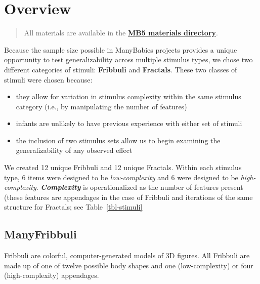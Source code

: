 \documentclass[
  letterpaper,
  DIV=11,
  numbers=noendperiod,
  oneside]{scrreprt}
\providecommand{\tightlist}{%
  \setlength{\itemsep}{0pt}\setlength{\parskip}{0pt}}
\begin{document}
\section{Overview}\label{overview-1}

\begin{quote}
All materials are available in the
\href{https://drive.google.com/drive/folders/1ces1jzHYVV0Wx29JAtdfGAZx_pDAAh5l?usp=sharing}{\textbf{MB5
materials directory}}.
\end{quote}

Because the sample size possible in ManyBabies projects provides a
unique opportunity to test generalizability across multiple stimulus
types, we chose two different categories of stimuli:
\textbf{Fribbuli} and \textbf{Fractals}. These two classes of stimuli were
chosen because:

\begin{itemize}
\tightlist
\item
  they allow for variation in stimulus complexity within the same
  stimulus category (i.e., by manipulating the number of features)
\item
  infants are unlikely to have previous experience with either set of
  stimuli
\item
  the inclusion of two stimulus sets allow us to begin examining the
  generalizability of any observed effect
\end{itemize}

We created 12 unique Fribbuli and 12 unique Fractals. Within each
stimulus type, 6 items were designed to be \emph{low-complexity} and 6
were designed to be \emph{high-complexity}. \textbf{\emph{Complexity}}
is operationalized as the number of features present (these features are
appendages in the case of Fribbuli and iterations of the same structure
for Fractals; see Table~\ref{tbl-stimuli}

\subsection[ManyFribbuli]{\texorpdfstring{ManyFribbuli}{ManyFribbuli}}\label{manyfribbulistimuli-3}

Fribbuli are colorful, computer-generated models of 3D figures. All
Fribbuli are made up of one of twelve possible body shapes and one
(low-complexity) or four (high-complexity) appendages.
\end{document}
